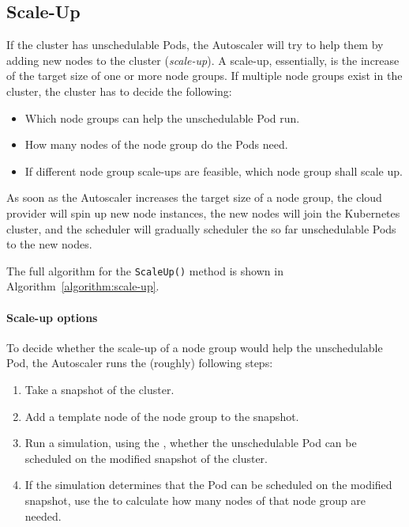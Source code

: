 \subsection{Scale-Up}
\label{section:design-scale-up}
If the cluster has unschedulable Pods, the Autoscaler will try to help them by
adding new nodes to the cluster (\textit{scale-up}). A scale-up, essentially, is
the increase of the target size of one or more node groups. If multiple node
groups exist in the cluster, the cluster has to decide the following:
\begin{itemize}
      \tightlist
      \item Which node groups can help the unschedulable Pod run.
      \item How many nodes of the node group do the Pods need.
      \item If different node group scale-ups are feasible, which node group
            shall scale up.
\end{itemize}

As soon as the Autoscaler increases the target size of a node group, the cloud
provider will spin up new node instances, the new nodes will join the Kubernetes
cluster, and the scheduler will gradually scheduler the so far unschedulable
Pods to the new nodes.

The full algorithm for the \texttt{ScaleUp()} method is shown in
Algorithm~\ref{algorithm:scale-up}.

\paragraph*{Scale-up options}
To decide whether the scale-up of a node group would help the unschedulable Pod,
the Autoscaler runs the (roughly) following steps:
\begin{enumerate}
      \tightlist
      \item Take a snapshot of the cluster.
      \item Add a template node of the node group to the snapshot.
      \item Run a simulation, using the ,
            whether the unschedulable Pod can be scheduled on the modified
            snapshot of the cluster.
      \item If the simulation determines that the Pod can be scheduled on the
            modified snapshot, use the  to calculate
            how many nodes of that node group are needed.
\end{enumerate}

